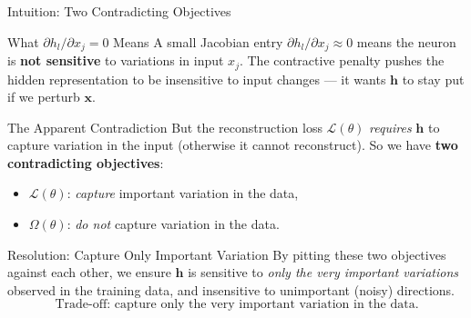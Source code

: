 \documentclass{beamer}
\begin{document}
\begin{frame}[shrink=10]{Intuition: Two Contradicting Objectives}
  \begin{block}{What $\partial h_l/\partial x_j = 0$ Means}
    A small Jacobian entry $\partial h_l/\partial x_j \approx 0$ means the
    neuron is \textbf{not sensitive} to variations in input $x_j$. The
    contractive penalty pushes the hidden representation to be insensitive
    to input changes --- it wants $\mathbf{h}$ to stay put if we perturb
    $\mathbf{x}$.
  \end{block}

  \begin{alertblock}{The Apparent Contradiction}
    But the reconstruction loss $\mathcal L(\theta)$ \emph{requires}
    $\mathbf{h}$ to capture variation in the input (otherwise it cannot
    reconstruct). So we have \textbf{two contradicting objectives}:
    \begin{itemize}\setlength\itemsep{2pt}
      \item $\mathcal L(\theta)$: \emph{capture} important variation in the data,
      \item $\Omega(\theta)$: \emph{do not} capture variation in the data.
    \end{itemize}
  \end{alertblock}

  \begin{block}{Resolution: Capture Only Important Variation}
    By pitting these two objectives against each other, we ensure
    $\mathbf{h}$ is sensitive to \emph{only the very important variations}
    observed in the training data, and insensitive to unimportant
    (noisy) directions.
    \[
      \boxed{\text{Trade-off: capture only the very important variation in the data.}}
    \]
  \end{block}
\end{frame}
\end{document}
